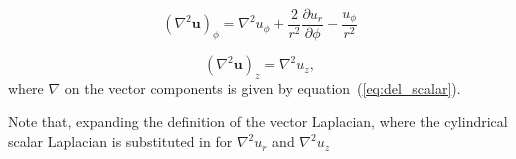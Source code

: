 \documentclass{paper}
\begin{document}
\begin{equation}
  \label{eq:vec_lap_phi}
  (\nabla^2 \mathbf{u})_\phi = \nabla^2 u_\phi + \frac{2}{r^2} \frac{\partial u_r}{\partial \phi} - \frac{u_\phi}{r^2} 
\end{equation}

\begin{equation}
  \label{eq:vec_lap_z}
  (\nabla^2 \mathbf{u})_z = \nabla^2 u_z,
\end{equation}
where $\nabla$ on the vector components is given by equation~(\ref{eq:del_scalar}).

Note that, expanding the definition of the vector Laplacian, where the cylindrical scalar Laplacian is substituted in for $\nabla^2 u_r$ and $\nabla^2 u_z$  
\end{document}
